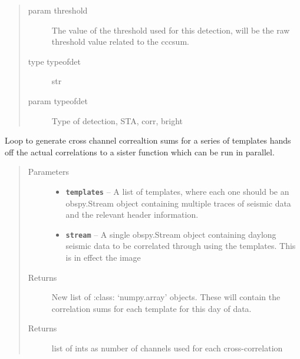 \documentclass[a4paper,10pt,english]{sphinxmanual}
\begin{document}
\begin{fulllineitems}
\begin{description}
\begin{quote}
\begin{description}
\item[{param threshold}] \leavevmode
The value of the threshold used for this detection,        will be the raw threshold value related to the cccsum.

\item[{type typeofdet}] \leavevmode
str

\item[{param typeofdet}] \leavevmode
Type of detection, STA, corr, bright

\end{description}\end{quote}

\end{description}

\end{fulllineitems}


\begin{fulllineitems}
\label{core:match_filter._channel_loop}
Loop to generate cross channel correaltion sums for a series of templates
hands off the actual correlations to a sister function which can be run in
parallel.
\begin{quote}\begin{description}
\item[{Parameters}] \leavevmode\begin{itemize}
\item {} 
\textbf{\texttt{templates}} -- A list of templates, where each one should be an    obspy.Stream object containing multiple traces of seismic data and the    relevant header information.

\item {} 
\textbf{\texttt{stream}} -- A single obspy.Stream object containing daylong seismic data    to be correlated through using the templates.  This is in effect the image

\end{itemize}

\item[{Returns}] \leavevmode
New list of :class: `numpy.array' objects.  These will contain the    correlation sums for each template for this day of data.

\item[{Returns}] \leavevmode
list of ints as number of channels used for each cross-correlation

\end{description}\end{quote}

\end{fulllineitems}
\end{document}
